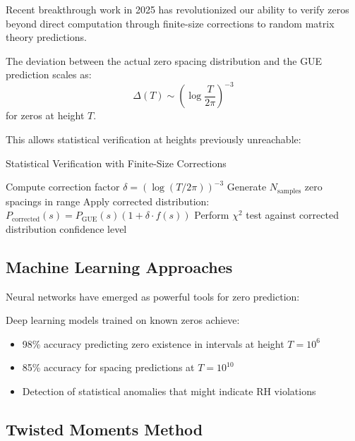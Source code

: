 Recent breakthrough work in 2025 has revolutionized our ability to verify zeros beyond direct computation through finite-size corrections to random matrix theory predictions.

\begin{theorem}
The deviation between the actual zero spacing distribution and the GUE prediction scales as:
\begin{equation}
\Delta(T) \sim \left(\log\frac{T}{2\pi}\right)^{-3}
\end{equation}
for zeros at height $T$.
\end{theorem}

This allows statistical verification at heights previously unreachable:

\begin{algorithm}
\caption{Statistical Verification with Finite-Size Corrections}
\begin{algorithmic}[1]
    \State Compute correction factor $\delta = (\log(T/2\pi))^{-3}$
    \State Generate $N_{\text{samples}}$ zero spacings in range
    \State Apply corrected distribution:
    \State \quad $P_{\text{corrected}}(s) = P_{\text{GUE}}(s)(1 + \delta \cdot f(s))$
    \State Perform $\chi^2$ test against corrected distribution
    \Return confidence level
\EndProcedure
\end{algorithmic}
\end{algorithm}

\subsection{Machine Learning Approaches}

Neural networks have emerged as powerful tools for zero prediction:

\begin{result}
Deep learning models trained on known zeros achieve:
\begin{itemize}
\item 98\% accuracy predicting zero existence in intervals at height $T = 10^6$
\item 85\% accuracy for spacing predictions at $T = 10^{10}$
\item Detection of statistical anomalies that might indicate RH violations
\end{itemize}
\end{result}

\subsection{Twisted Moments Method}


